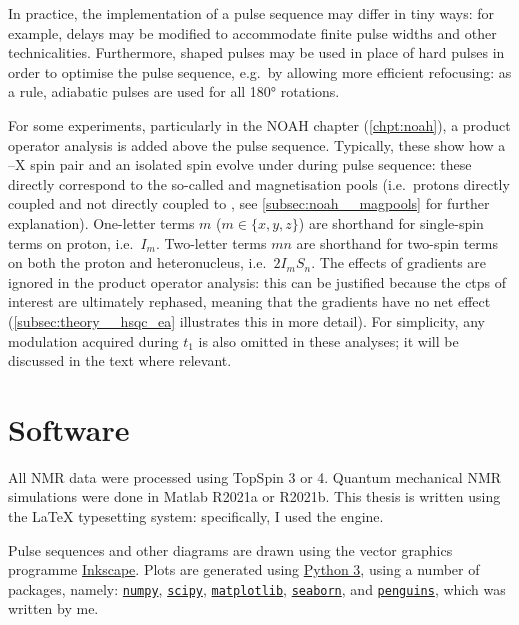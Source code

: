 In practice, the implementation of a pulse sequence may differ in tiny ways: for example, delays may be modified to accommodate finite pulse widths and other technicalities.
Furthermore, shaped pulses may be used in place of hard pulses in order to optimise the pulse sequence, e.g.\ by allowing more efficient refocusing: as a rule, adiabatic pulses are used for all \carbon{} \ang{180} rotations.

For some experiments, particularly in the NOAH chapter (\cref{chpt:noah}), a product operator analysis is added above the pulse sequence.
Typically, these show how a \proton{}--X spin pair and an isolated \proton{} spin evolve under during pulse sequence: these directly correspond to the so-called  and  magnetisation pools (i.e.\ protons directly coupled and not directly coupled to \carbon{}, see \cref{subsec:noah__magpools} for further explanation).
One-letter terms $m$ ($m \in \{x, y, z\}$) are shorthand for single-spin terms on proton, i.e.\ $I_m$.
Two-letter terms $mn$ are shorthand for two-spin terms on both the proton and heteronucleus, i.e.\ $2I_mS_n$.
The effects of gradients are ignored in the product operator analysis: this can be justified because the \acp{ctp} of interest are ultimately rephased, meaning that the gradients have no net effect (\cref{subsec:theory__hsqc_ea} illustrates this in more detail).
For simplicity, any modulation acquired during $t_1$ is also omitted in these analyses; it will be discussed in the text where relevant.

\section*{Software}

All NMR data were processed using TopSpin 3 or 4.
Quantum mechanical NMR simulations were done in Matlab R2021a or R2021b.
This thesis is written using the \LaTeX{} typesetting system: specifically, I used the \LuaLaTeX{} engine.

Pulse sequences and other diagrams are drawn using the vector graphics programme \href{https://inkscape.org/}{Inkscape}.
Plots are generated using \href{https://www.python.org/}{Python 3}, using a number of packages, namely: \href{https://github.com/numpy/numpy}{\texttt{numpy}}, \href{https://github.com/scipy/scipy}{\texttt{scipy}}, \href{https://github.com/matplotlib/matplotlib}{\texttt{matplotlib}}, \href{https://github.com/mwaskom/seaborn}{\texttt{seaborn}}, and \href{https://github.com/yongrenjie/penguins}{\texttt{penguins}}, which was written by me.

